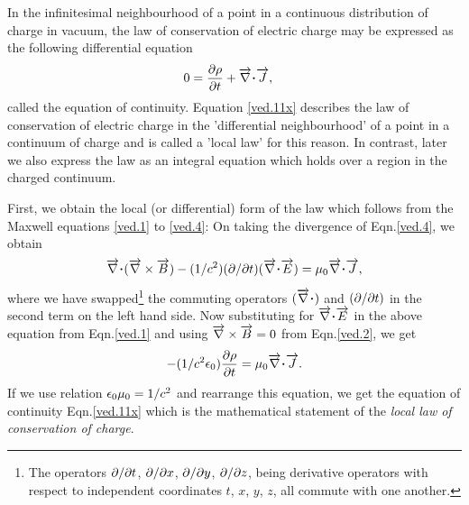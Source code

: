 In the infinitesimal neighbourhood of a point in a 
continuous distribution of charge in vacuum, the law of 
conservation of electric charge may be expressed as the  
following differential equation
\begin{align}\label{ved.11x}
0&=\pdv{\rho}{t} +\vnab \dotp\vec{J},
\end{align}
called the equation of continuity. Equation \eqref{ved.11x} 
describes the law of  conservation of electric charge in the 
'differential neighbourhood' of a point in a continuum of 
charge and  is called a  'local law' for this reason. In 
contrast, later we also express the law  as an integral 
equation which holds over a region in the charged 
continuum. 

First, we obtain the local (or differential) form of the law 
which follows from the  Maxwell equations  \eqref{ved.1} to 
\eqref{ved.4}: On taking the divergence of 
Eqn.\eqref{ved.4}, we obtain
\begin{align*}
\vnab\dotp(\vnab\cross\vec{B})-(1/c^2)(\dow/\dow
t)(\vnab\dotp\vec{E})=\gkm_0\vnab\dotp\vec{J},
\end{align*}
where we have swapped\footnote{The operators ${\partial}/{\partial} t$, 
${\partial}/{\partial} x$, ${\partial}/{\partial} y$, ${\partial}/{\partial} z$, being 
derivative operators with respect to independent coordinates 
$t$, $x$, $y$, $z$, all commute with one another.} the 
commuting operators $(\vnab\dotp)$ and  $({\partial}/{\partial} t)$ in 
the second term on the left hand side. Now substituting for 
$\vnab\dotp\vec{E}$ in the above equation from  
Eqn.\eqref{ved.1} and using ${\overrightarrow{\nabla} }\times\overrightarrow{B}=0$ from 
Eqn.\eqref{ved.2}, we get
\begin{align*}
-(1/c^2\epso)\pdv{\gkr}{t}
=\gkm_0\vnab\dotp\vec{J}.
\end{align*}
If we use relation $\epsilon_0{\mu}_0=1/c^2$ and rearrange this 
equation, we get the equation of continuity 
Eqn.\eqref{ved.11x} which is the mathematical statement of 
the \textsl{local law of conservation of charge}.


